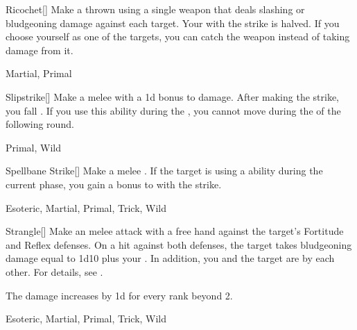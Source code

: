 \lowercase{\hypertarget{maneuver:Ricochet}{}}\label{maneuver:Ricochet}
\hypertarget{maneuver:Ricochet}{}
\begin{freeability}[Rank 2]{Ricochet}[]
Make a thrown  using a single weapon that deals slashing or bludgeoning damage against each target.
Your  with the strike is halved.
If you choose yourself as one of the targets, you can catch the weapon instead of taking damage from it.


 Martial, Primal
\end{freeability}
\vspace{0.25em}



\lowercase{\hypertarget{maneuver:Slipstrike}{}}\label{maneuver:Slipstrike}
\hypertarget{maneuver:Slipstrike}{}
\begin{freeability}[Rank 2]{Slipstrike}[]
Make a melee  with a \plus1d bonus to damage.
After making the strike, you fall .
If you use this ability during the , you cannot move during the  of the following round.


 Primal, Wild
\end{freeability}
\vspace{0.25em}



\lowercase{\hypertarget{maneuver:Spellbane Strike}{}}\label{maneuver:Spellbane Strike}
\hypertarget{maneuver:Spellbane Strike}{}
\begin{freeability}[Rank 2]{Spellbane Strike}[]
Make a melee .
If the target is using a  ability during the current phase, you gain a  bonus to  with the strike.


 Esoteric, Martial, Primal, Trick, Wild
\end{freeability}
\vspace{0.25em}



\lowercase{\hypertarget{maneuver:Strangle}{}}\label{maneuver:Strangle}
\hypertarget{maneuver:Strangle}{}
\begin{freeability}[Rank 2]{Strangle}[]
Make an melee attack with a free hand against the target's Fortitude and Reflex defenses.
On a hit against both defenses, the target takes bludgeoning damage equal to 1d10 plus your .
In addition, you and the target are  by each other.
For details, see .

\rankline
The damage increases by \plus1d for every rank beyond 2.


 Esoteric, Martial, Primal, Trick, Wild
\end{freeability}
\vspace{0.25em}



